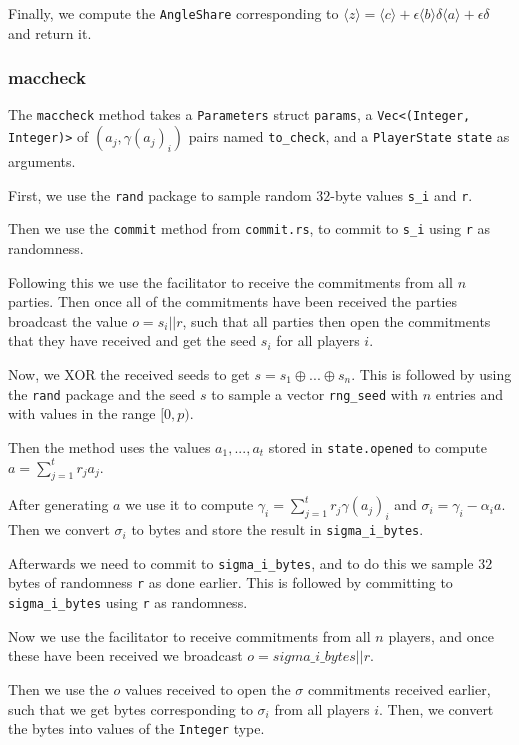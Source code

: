 \documentclass[../main.tex]{subfiles}
\begin{document}
Finally, we compute the \lstinline{AngleShare} corresponding to $\langle z \rangle = \langle c \rangle + \epsilon \langle b \rangle \delta \langle a \rangle + \epsilon \delta$ and return it.
\subsubsection{maccheck}
The \lstinline{maccheck} method takes a \lstinline{Parameters} struct \lstinline{params}, a \lstinline{Vec<(Integer, Integer)>} of $(a_j, \gamma(a_j)_i)$ pairs named \lstinline{to_check}, and a \lstinline{PlayerState} \lstinline{state} as arguments.

First, we use the \lstinline{rand} package to sample random $32$-byte values  \lstinline{s_i} and \lstinline{r}.

Then we use the \lstinline{commit} method from \lstinline{commit.rs}, to commit to \lstinline{s_i} using \lstinline{r} as randomness.

Following this we use the facilitator to receive the commitments from all $n$ parties. Then once all of the commitments have been received the parties broadcast the value $o = s_i || r$, such that all parties then open the commitments that they have received and get the seed $s_i$ for all players $i$.

Now, we XOR the received seeds to get $s = s_1 \oplus ... \oplus s_n$. This is followed by using the \lstinline{rand} package and the seed $s$ to sample a vector \lstinline{rng_seed} with $n$ entries and with values in the range $[0, p)$.

Then the method uses the values $a_1, ..., a_t$ stored in \lstinline{state.opened} to compute $a = \sum^t_{j = 1} r_j a_j$. %

After generating $a$ we use it to compute $\gamma_i = \sum^t_{j = 1} r_j \gamma(a_j)_i$ and $\sigma_i = \gamma_i - \alpha_i a$. Then we convert $\sigma_i$ to bytes and store the result in \lstinline{sigma_i_bytes}.

Afterwards we need to commit to \lstinline{sigma_i_bytes}, and to do this we sample $32$ bytes of randomness \lstinline{r} as done earlier. This is followed by committing to \lstinline{sigma_i_bytes} using \lstinline{r} as randomness.

Now we use the facilitator to receive commitments from all $n$ players, and once these have been received we broadcast $o = sigma\_i\_bytes || r$.

Then we use the $o$ values received to open the $\sigma$ commitments received earlier, such that we get bytes corresponding to $\sigma_i$ from all players $i$. Then, we convert the bytes into values of the \lstinline{Integer} type.
\end{document}
